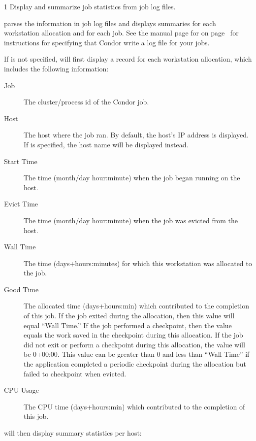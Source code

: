 \begin{ManPage}{\label{man-condor-userlog}}{1}
{Display and summarize job statistics from job log files.}
\Synopsis {}

\Description
{} parses the information in job log files and displays
summaries for each workstation allocation and for each job.  See the
manual page for  on page~\pageref{man-condor-submit} for
instructions for specifying that Condor write a log file for your
jobs.

If  is not specified,  will first display
a record for each workstation allocation, which includes the following
information:

\begin{description}
\item[Job] The cluster/process id of the Condor job.
\item[Host] The host where the job ran.  By default, the host's IP
address is displayed.  If  is specified, the host name
will be displayed instead.
\item[Start Time] The time (month/day hour:minute) when the job began
running on the host.
\item[Evict Time] The time (month/day hour:minute) when
the job was evicted from the host.
\item[Wall Time] The time (days+hours:minutes) for which this workstation was
allocated to the job.
\item[Good Time] The allocated time (days+hours:min) which
contributed to the completion of this job.  If the job exited during
the allocation, then this value will equal ``Wall Time.''  If the job
performed a checkpoint, then the value equals the work saved in
the checkpoint during this allocation.  If the job did not exit or
perform a checkpoint during this allocation, the value will be 0+00:00.
This value can be greater than 0 and less than ``Wall Time'' if the
application completed a periodic checkpoint during the allocation but
failed to checkpoint when evicted.
\item[CPU Usage] The CPU time (days+hours:min) which contributed to
the completion of this job.
\end{description}

 will then display summary statistics per host:


\end{ManPage}
